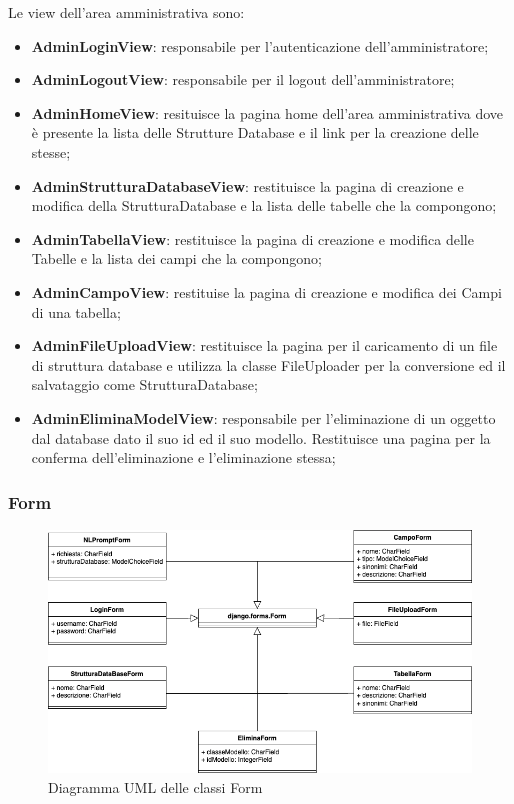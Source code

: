 \documentclass[5pt]{article}
\begin{document}
	Le view dell'area amministrativa sono:
	\begin{itemize}
		\item \textbf{AdminLoginView}: responsabile per l'autenticazione dell'amministratore;
		\item \textbf{AdminLogoutView}: responsabile per il logout dell'amministratore;
		\item \textbf{AdminHomeView}: resituisce la pagina home dell'area amministrativa dove è presente la lista delle Strutture Database e il link per la creazione delle stesse;
		\item \textbf{AdminStrutturaDatabaseView}: restituisce la pagina di creazione e modifica della StrutturaDatabase e la lista delle tabelle che la compongono;
		\item \textbf{AdminTabellaView}: restituisce la pagina di creazione e modifica delle Tabelle e la lista dei campi che la compongono;
		\item \textbf{AdminCampoView}: restituise la pagina di creazione e modifica dei Campi di una tabella;
		\item \textbf{AdminFileUploadView}: restituisce la pagina per il caricamento di un file di struttura database e utilizza la classe FileUploader per la conversione ed il salvataggio come StrutturaDatabase;
		\item \textbf{AdminEliminaModelView}: responsabile per l'eliminazione di un oggetto dal database dato il suo id ed il suo modello. Restituisce una pagina per la conferma dell'eliminazione e l'eliminazione stessa;
	\end{itemize}
	
	\subsubsection{Form}
	\begin{figure}[H]
			\includegraphics[scale=0.65]{UML_classes/forms.png}
			\caption{Diagramma UML delle classi Form}
			\centering
	\end{figure}
\end{document}
